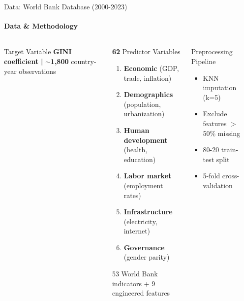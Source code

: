 \documentclass[aspectratio=169,8pt]{beamer}
\begin{document}
    \begin{frame}{Data: World Bank Database (2000-2023)}
        \framesubtitle{Data \& Methodology}
        \begin{columns}[T]
            \begin{exampleblock}{Target Variable}
                \textbf{GINI coefficient} \textbf{|} $\sim$\textbf{1,800} country-year observations
            \end{exampleblock}

            \vspace{0.15cm}
            \begin{block}{\textbf{62} Predictor Variables}
                \begin{enumerate}
                    \item \textbf{Economic} (GDP, trade, inflation)
                    \item \textbf{Demographics} (population, urbanization)
                    \item \textbf{Human development} (health, education)
                    \item \textbf{Labor market} (employment rates)
                    \item \textbf{Infrastructure} (electricity, internet)
                    \item \textbf{Governance} (gender parity)
                \end{enumerate}
                \small 53 World Bank indicators + 9 engineered features
            \end{block}

            \begin{block}{Preprocessing Pipeline}
                \begin{itemize}
                    \item KNN imputation (k=5)
                    \item Exclude features $>$50\% missing
                    \item 80-20 train-test split
                    \item 5-fold cross-validation
                \end{itemize}
            \end{block}

            \vspace{0.15cm}
            \begin{center}
            \end{center}
        \end{columns}
    \end{frame}
\end{document}

